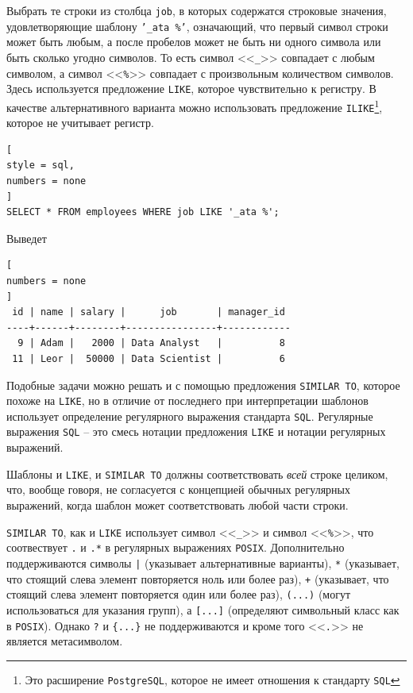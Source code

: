 \documentclass[%
	11pt,
	a4paper,
	utf8,
		]{article}
\begin{document}
Выбрать те строки из столбца \texttt{job}, в которых содержатся строковые значения, удовлетворяющие шаблону \texttt{'\_ata \%'}, означающий, что первый символ строки может быть любым, а после пробелов может не быть ни одного символа или быть сколько угодно символов. То есть символ <<\texttt{\_}>> совпадает с любым символом, а символ <<\texttt{\%}>> совпадает с произвольным количеством символов. Здесь используется предложение \texttt{LIKE}, которое чувствительно к регистру. В качестве альтернативного варианта можно использовать предложение \texttt{ILIKE}\footnote{Это расширение \texttt{PostgreSQL}, которое не имеет отношения к стандарту \texttt{SQL}}, которое не учитывает регистр.

\begin{lstlisting}[
style = sql,
numbers = none
]
SELECT * FROM employees WHERE job LIKE '_ata %';
\end{lstlisting}

Выведет
\begin{lstlisting}[
numbers = none
]
 id | name | salary |      job       | manager_id
----+------+--------+----------------+------------
  9 | Adam |   2000 | Data Analyst   |          8
 11 | Leor |  50000 | Data Scientist |          6
\end{lstlisting}

Подобные задачи можно решать и с помощью предложения \texttt{SIMILAR TO}, которое похоже на \texttt{LIKE}, но в отличие от последнего при интерпретации шаблонов использует определение регулярного выражения стандарта \texttt{SQL}. Регулярные выражения \texttt{SQL} -- это смесь нотации предложения \texttt{LIKE} и нотации регулярных выражений.

Шаблоны и \texttt{LIKE}, и \texttt{SIMILAR TO} должны соответствовать \emph{всей} строке целиком, что, вообще говоря, не согласуется с концепцией обычных регулярных выражений, когда шаблон может соответствовать любой части строки. 

\texttt{SIMILAR TO}, как и \texttt{LIKE} использует символ <<\texttt{\_}>> и символ <<\texttt{\%}>>, что соотвествует \texttt{.} и \texttt{.*} в регулярных выражениях \texttt{POSIX}. Дополнительно поддерживаются символы \texttt{|} (указывает альтернативные варианты), \texttt{*} (указывает, что стоящий слева элемент повторяется ноль или более раз), \texttt{+} (указывает, что стоящий слева элемент повторяется один или более раз), \texttt{(...)} (могут использоваться для указания групп), а \texttt{[...]} (определяют символьный класс как в \texttt{POSIX}). Однако \texttt{?} и \texttt{\{...\}} не поддерживаются и кроме того <<\texttt{.}>> не является метасимволом.
\end{document}
